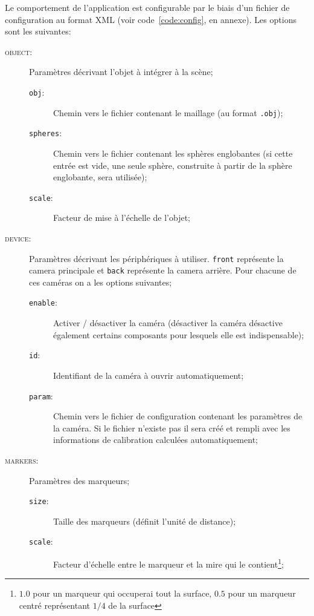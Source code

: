 \documentclass[10pt,a4paper,twoside, twocolumn]{report}
\begin{document}
Le comportement de l'application est configurable par le biais d'un fichier de configuration au format XML (voir code~\ref{code:config}, en annexe). Les options sont les suivantes:
\begin{description}
	\item[\textsc{object}:]		Paramètres décrivant l'objet à intégrer à la scène;
		\begin{description}
			\item[\texttt{obj}:]						Chemin vers le fichier contenant le maillage (au format \texttt{.obj});
			\item[\texttt{spheres}:]				Chemin vers le fichier contenant les sphères englobantes (si cette entrée est vide, une seule sphère, construite à partir de la sphère englobante, sera utilisée);
			\item[\texttt{scale}:]					Facteur de mise à l’échelle de l'objet;
		\end{description}

	\item[\textsc{device}:]		Paramètres décrivant les périphériques à utiliser. \texttt{front} représente la camera principale et \texttt{back} représente la camera arrière. Pour chacune de ces caméras on a les options suivantes;
		\begin{description}
			\item[\texttt{enable}:]					Activer / désactiver la caméra (désactiver la caméra désactive également certains composants pour lesquels elle est indispensable);
			\item[\texttt{id}:]							Identifiant de la caméra à ouvrir automatiquement;
			\item[\texttt{param}:]					Chemin vers le fichier de configuration contenant les paramètres de la caméra. Si le fichier n'existe pas il sera créé et rempli avec les informations de calibration calculées automatiquement;
		\end{description}

	\item[\textsc{markers}:]	Paramètres des marqueurs;
		\begin{description}
			\item[\texttt{size}:]						Taille des marqueurs (définit l’unité de distance);
			\item[\texttt{scale}:]					Facteur d’échelle entre le marqueur et la mire qui le contient\footnote{$1.0$ pour un marqueur qui occuperai tout la surface, $0.5$ pour un marqueur centré représentant $1/4$ de la surface};
		\end{description}
	

\end{description}
\end{document}
